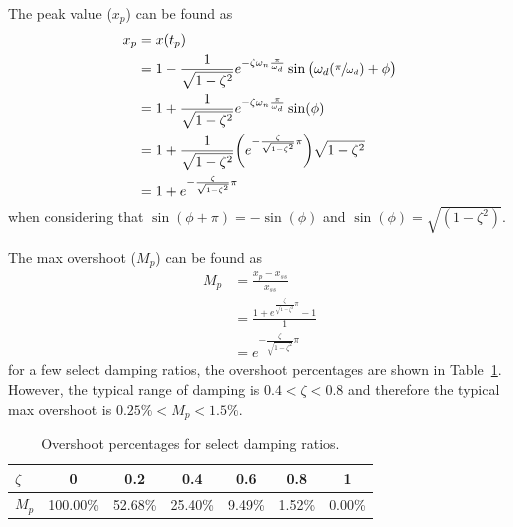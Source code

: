\documentclass[12pt,letter]{article}
\begin{document}
The peak value ($x_p$) can be found as
\begin{align}
x_p &= x(t_p) \\
&= 1 - \frac{1}{ \sqrt{1-\zeta^2}} e^{-\zeta \omega_n \frac{\pi}{\omega_d}} \sin\big(\omega_d (\sfrac{\pi}{\omega_d}) + \phi \big)\nonumber \\
&= 1 + \frac{1}{ \sqrt{1-\zeta^2}} e^{-\zeta \omega_n \frac{\pi}{\omega_d}} \sin(\phi)\nonumber \\
&= 1 + \frac{1}{ \sqrt{1-\zeta^2}} \bigg( e^{- \frac{\zeta}{\sqrt{1-\zeta^2}} \pi} \bigg) \sqrt{1-\zeta^2} \nonumber \\
&= 1 + e^{- \frac{\zeta}{\sqrt{1-\zeta^2}} \pi} \nonumber
\end{align}
when considering that $\sin(\phi + \pi) = -\sin(\phi)$ and $\sin(\phi) = \sqrt{(1-\zeta^2)}$.


The max overshoot ($M_p$) can be found as
\begin{align}
M_p &= \frac{x_p - x_{ss}}{x_{ss}} \\
&= \frac{1 + e^{\frac{\zeta}{\sqrt{1-\zeta^2}}\pi} -1 }{1} \nonumber \\
&= e^{- \frac{\zeta}{\sqrt{1-\zeta^2}} \pi } \nonumber 
\end{align}
for a few select damping ratios, the overshoot percentages are shown in Table~\ref{table:mp_and_damping_ratio}. However, the typical range of damping is $0.4 < \zeta < 0.8$ and therefore the typical max overshoot is $0.25\% < M_p < 1.5\%$.
\begin{table}[H]
\centering
\caption{Overshoot percentages for select damping ratios.}
\label{table:mp_and_damping_ratio}
\begin{tabular}{@{}lcccccc@{}}
\toprule
$\zeta$ & 0 & 0.2 & 0.4 & 0.6 & 0.8 & 1 \\ \midrule 
$M_p$ & 100.00\% & 52.68\% & 25.40\% & 9.49\% & 1.52\% & 0.00\% \\ \bottomrule
\end{tabular}
\end{table}
\end{document}
